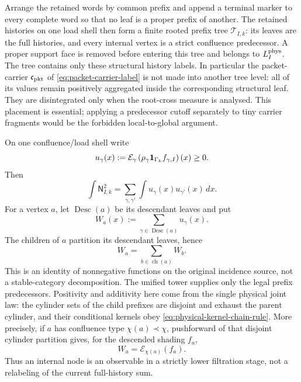 \documentclass[11pt]{article}
\begin{document}
Arrange the retained words by common prefix and append a terminal marker to
every complete word so that no leaf is a proper prefix of another.  The
retained histories on one load shell then form a finite rooted prefix tree
\(\mathscr T_{I,k}\): its leaves are the full histories, and every internal
vertex is a strict confluence predecessor.  A proper support face is removed
before entering this tree and belongs to \(L_I^{\rm phys}\).
The tree contains only these structural history labels.  In particular the
packet-carrier \(\mathfrak c_{\rm pkt}\) of
\eqref{eq:packet-carrier-label} is not made into another tree level: all of its
values remain positively aggregated inside the corresponding structural leaf.
They are disintegrated only when the root-cross measure is analysed.  This
placement is essential; applying a predecessor cutoff separately to tiny
carrier fragments would be the forbidden local-to-global argument.

On one confluence/load shell write
\[
 u_\gamma(x)
 :=
 \mathcal E_\gamma
 \left(
 \rho_\gamma{\bf1}_{\Gamma_k}f_{\gamma,I}
 \right)(x)\ge0.
\]
Then
\begin{equation}\label{eq:double-history-expansion}
 \int\mathsf N_{I,k}^2
 =
 \sum_{\gamma,\gamma'}
 \int u_\gamma(x)u_{\gamma'}(x)\,dx.
\end{equation}
For a vertex \(a\), let \(\operatorname{Desc}(a)\) be its descendant leaves and
put
\begin{equation}\label{eq:history-node-mass}
 W_a(x):=\sum_{\gamma\in\operatorname{Desc}(a)}u_\gamma(x).
\end{equation}
The children of \(a\) partition its descendant leaves, hence
\begin{equation}\label{eq:history-martingale-partition}
 W_a=\sum_{b\in\operatorname{ch}(a)}W_b.
\end{equation}
This is an identity of nonnegative functions on the original incidence source,
not a stable-category decomposition.  The unified tower supplies only the legal prefix
predecessors.  Positivity and additivity here come from the single physical
joint law: the cylinder sets of the child prefixes are disjoint and exhaust
the parent cylinder, and their conditional kernels obey
\eqref{eq:physical-kernel-chain-rule}.  More precisely, if \(a\) has
confluence type \(\chi(a)\prec\chi\), pushforward of that disjoint cylinder
partition gives, for the descended shading \(f_a\),
\begin{equation}\label{eq:node-predecessor-realization}
 W_a
 =\mathcal E_{\chi(a)}(f_a).
\end{equation}
Thus an internal node is an observable in a strictly lower filtration stage,
not a relabeling of the current full-history sum.
\end{document}
